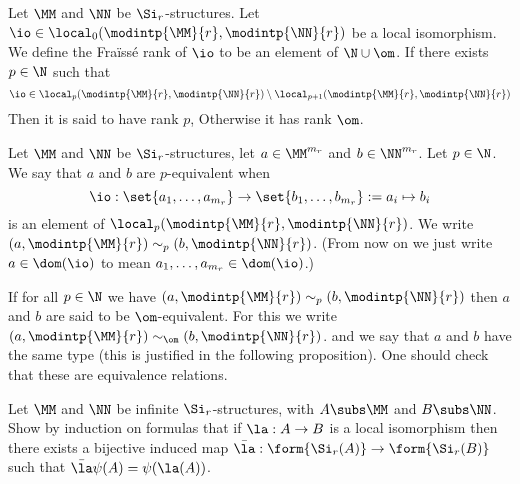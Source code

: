 \begin{dfn}
    Let $\MM$ and $\NN$ be $\Si_r$-structures.
    Let $\io \in \local_0(\modintp{\MM}{r},\modintp{\NN}{r})$ be a local
    isomorphism. 
    We define the Fraïssé rank of $\io$ to be an element of $\N \cup {\om}$.
    If there exists $p \in \N$ such that
    \[
        \io \in \local_p(\modintp{\MM}{r},\modintp{\NN}{r}) 
        \setminus \local_{p+1}(\modintp{\MM}{r},\modintp{\NN}{r})
    \]
    Then it is said to have rank $p$,
    Otherwise it has rank $\om$.
\end{dfn}

\begin{dfn}[$p$-equivalence]
    Let $\MM$ and $\NN$ be $\Si_r$-structures,
    let $a \in \MM^{m_r}$ and $b \in \NN^{m_r}$.
    Let $p \in \N$.
    We say that $a$ and $b$ are $p$-equivalent when 
    \[\io : \set{a_1,\dots,a_{m_r}} \to \set{b_1,\dots,b_{m_r}}
    := a_i \mapsto b_i\]
    is an element of $\local_p(\modintp{\MM}{r},\modintp{\NN}{r})$.
    We write $(a,\modintp{\MM}{r}) \sim_p (b, \modintp{\NN}{r})$.
    (From now on we just write $a \in \dom(\io)$ to mean 
    $a_1,\dots,a_{m_r} \in \dom(\io)$.)

    If for all $p \in \N$ we have 
    $(a,\modintp{\MM}{r}) \sim_p (b, \modintp{\NN}{r})$
    then $a$ and $b$ are said to be $\om$-equivalent.
    For this we write $(a,\modintp{\MM}{r}) \sim_\om (b, \modintp{\NN}{r})$.
    and we say that $a$ and $b$ have the same type 
    (this is justified in the following proposition).
    One should check that these are equivalence relations.    
\end{dfn}

\begin{ex}
    Let $\MM$ and $\NN$ be infinite $\Si_r$-structures,
    with $A \subs \MM$ and $B \subs \NN$.
    Show by induction on formulas that if $\la : A \to B$ is a local isomorphism
    then there exists a bijective induced map 
    $\bar{\la} : \form{\Si_r(A)} \to \form{\Si_r(B)}$
    such that $\bar{\la} \psi(A) = \psi(\la(A))$.
\end{ex}


